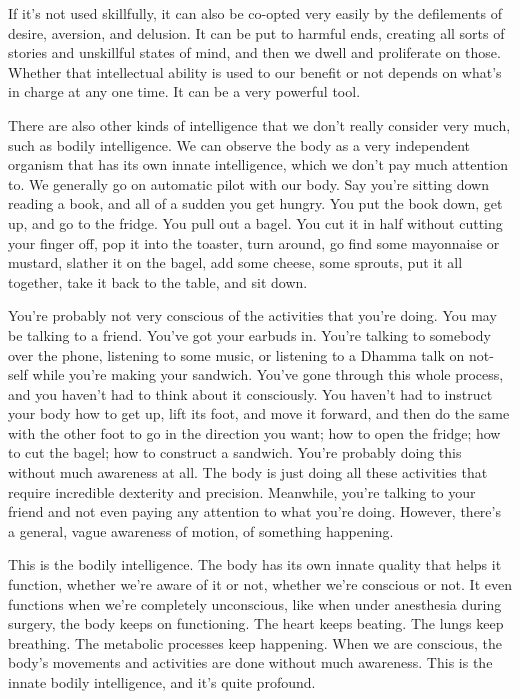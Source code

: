 If it's not used skillfully, it can also be co-opted very easily by the defilements of desire, aversion, and delusion. It can be put to harmful ends, creating all sorts of stories and unskillful states of mind, and then we dwell and proliferate on those. Whether that intellectual ability is used to our benefit or not depends on what's in charge at any one time. It can be a very powerful tool.

There are also other kinds of intelligence that we don't really consider very much, such as bodily intelligence. We can observe the body as a very independent organism that has its own innate intelligence, which we don't pay much attention to. We generally go on automatic pilot with our body. Say you're sitting down reading a book, and all of a sudden you get hungry. You put the book down, get up, and go to the fridge. You pull out a bagel. You cut it in half without cutting your finger off, pop it into the toaster, turn around, go find some mayonnaise or mustard, slather it on the bagel, add some cheese, some sprouts, put it all together, take it back to the table, and sit down.

You're probably not very conscious of the activities that you're doing. You may be talking to a friend. You've got your earbuds in. You're talking to somebody over the phone, lis\-tening to some music, or listening to a Dhamma talk on not-self while you're making your sandwich. You've gone through this whole process, and you haven't had to think about it consciously. You haven't had to instruct your body how to get up, lift its foot, and move it forward, and then do the same with the other foot to go in the direction you want; how to open the fridge; how to cut the bagel; how to construct a sandwich. You're probably doing this without much awareness at all. The body is just doing all these activities that require incredible dexterity and precision. Meanwhile, you're talking to your friend and not even paying any attention to what you're doing. However, there's a general, vague awareness of motion, of something happening.

This is the bodily intelligence. The body has its own innate quality that helps it function, whether we're aware of it or not, whether we're conscious or not. It even functions when we're completely unconscious, like when under anesthesia during surgery, the body keeps on functioning. The heart keeps beating. The lungs keep breathing. The metabolic processes keep happening. When we are conscious, the body's movements and activities are done without much awareness. This is the innate bodily intelligence, and it's quite profound.

